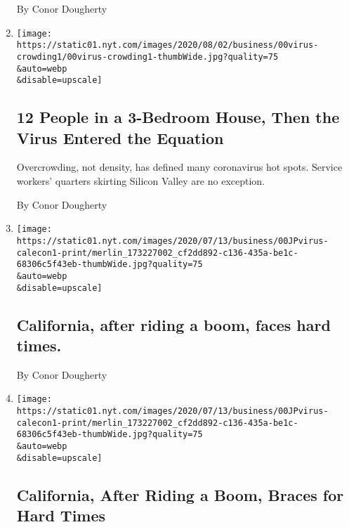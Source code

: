 \begin{enumerate}
  By Conor Dougherty
\item
  \href{/2020/08/01/business/economy/housing-overcrowding-coronavirus.html}{}

  \texttt{[image: https://static01.nyt.com/images/2020/08/02/business/00virus-crowding1/00virus-crowding1-thumbWide.jpg?quality=75\\\&auto=webp\\\&disable=upscale]}

  \hypertarget{12-people-in-a-3-bedroom-house-then-the-virus-entered-the-equation}{%
  \subsection{12 People in a 3-Bedroom House, Then the Virus Entered the
  Equation}\label{12-people-in-a-3-bedroom-house-then-the-virus-entered-the-equation}}

  Overcrowding, not density, has defined many coronavirus hot spots.
  Service workers' quarters skirting Silicon Valley are no exception.

  By Conor Dougherty
\item
  \href{/live/2020/07/10/business/stock-market-today-coronavirus/california-after-riding-a-boom-faces-hard-times}{}

  \texttt{[image: https://static01.nyt.com/images/2020/07/13/business/00JPvirus-calecon1-print/merlin\_173227002\_cf2dd892-c136-435a-be1c-68306c5f43eb-thumbWide.jpg?quality=75\\\&auto=webp\\\&disable=upscale]}

  \hypertarget{california-after-riding-a-boom-faces-hard-times}{%
  \subsection{California, after riding a boom, faces hard
  times.}\label{california-after-riding-a-boom-faces-hard-times}}

  By Conor Dougherty
\item
  \href{/2020/07/10/business/economy/california-economy-coronavirus.html}{}

  \texttt{[image: https://static01.nyt.com/images/2020/07/13/business/00JPvirus-calecon1-print/merlin\_173227002\_cf2dd892-c136-435a-be1c-68306c5f43eb-thumbWide.jpg?quality=75\\\&auto=webp\\\&disable=upscale]}

  \hypertarget{california-after-riding-a-boom-braces-for-hard-times}{%
  \subsection{California, After Riding a Boom, Braces for Hard
  Times}\label{california-after-riding-a-boom-braces-for-hard-times}}


\end{enumerate}
